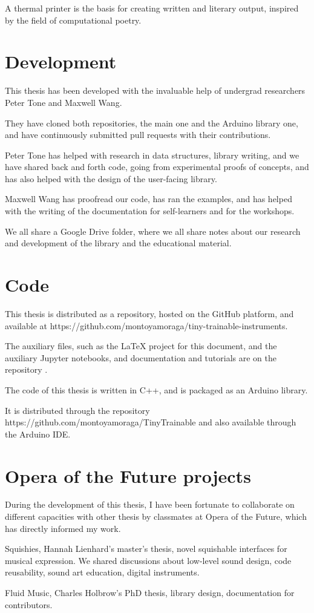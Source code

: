 A thermal printer is the basis for creating written and literary output, inspired by the field of computational poetry.

\section{Development}

This thesis has been developed with the invaluable help of undergrad researchers Peter Tone and Maxwell Wang.

They have cloned both repositories, the main one and the Arduino library one, and have continuously submitted pull requests with their contributions.

Peter Tone has helped with research in data structures, library writing, and we have shared back and forth code, going from experimental proofs of concepts, and has also helped with the design of the user-facing library.

Maxwell Wang has proofread our code, has ran the examples, and has helped with the writing of the documentation for self-learners and for the workshops.

We all share a Google Drive folder, where we all share notes about our research and development of the library and the educational material.

\section{Code}

This thesis is distributed as a repository, hosted on the GitHub platform, and available at https://github.com/montoyamoraga/tiny-trainable-instruments.



The auxiliary files, such as the LaTeX project for this document, and the auxiliary Jupyter notebooks, and documentation and tutorials are on the repository .


The code of this thesis is written in C++, and is packaged as an Arduino library.

It is distributed through the repository https://github.com/montoyamoraga/TinyTrainable and also available through the Arduino IDE.


\section{Opera of the Future projects}

During the development of this thesis, I have been fortunate to collaborate on different capacities with other thesis by classmates at Opera of the Future, which has directly informed my work.

Squishies, Hannah Lienhard's master's thesis, novel squishable interfaces for musical expression. We shared discussions about low-level sound design, code reusability, sound art education, digital instruments.

Fluid Music, Charles Holbrow's PhD thesis, library design, documentation for contributors.

